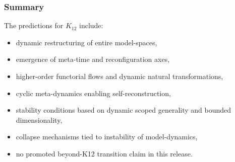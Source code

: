\subsubsection{Summary}

The predictions for $K_{12}$ include:
\begin{itemize}
    \item dynamic restructuring of entire model-spaces,
    \item emergence of meta-time and reconfiguration axes,
    \item higher-order functorial flows and dynamic natural transformations,
    \item cyclic meta-dynamics enabling self-reconstruction,
    \item stability conditions based on dynamic scoped generality and bounded dimensionality,
    \item collapse mechanisms tied to instability of model-dynamics,
    \item no promoted beyond-K12 transition claim in this release.
\end{itemize}
